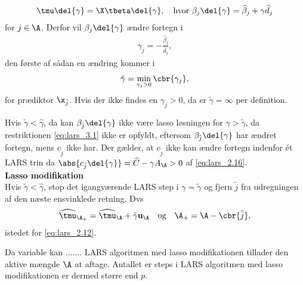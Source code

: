 \begin{align*}
\tmu \del{\gamma} = \X \tbeta \del{\gamma}, \quad \text{hvor } \beta_j \del{\gamma} = \widehat{\beta}_j + \gamma \widehat{d}_j
\end{align*}
for \(j \in \A\).
Derfor vil \(\beta_j \del{\gamma}\) ændre fortegn i
\begin{align*}
\gamma_j = -\frac{\widehat{\beta}_j}{\widehat{d}_j},
\end{align*}
den første af sådan en ændring kommer i
\begin{align*}
\tilde{\gamma} = \min_{\gamma_j > 0} \cbr{\gamma_j},
\end{align*}
for prædiktor \(\x_{\tilde{j}}\).
Hvis der ikke findes en \(\gamma_j > 0\), da er \(\tilde{\gamma}=\infty\) per definition.

Hvis \(\tilde{\gamma} < \widehat{\gamma}\), da kan \(\beta_{\tilde{j}} \del{\gamma}\) ikke være lasso løsningen for \(\gamma > \tilde{\gamma}\), da restriktionen \eqref{eq:lars_3.1} ikke er opfyldt, eftersom \(\beta_{\tilde{j}} \del{\gamma}\) har ændret fortegn, mens \(c_{\tilde{j}}\) ikke har.
Der gælder, at \(c_{\tilde{j}}\) ikke kan ændre fortegn indenfor ét LARS trin da \(\abs{c_{\tilde{j}} \del{\gamma}} = \widehat{C} - \gamma A_\A> 0\) af \eqref{eq:lars_2.16}. \\[2mm]
%
\textbf{Lasso modifikation} \\
Hvis \(\tilde{\gamma} < \widehat{\gamma}\), stop det igangværende LARS step i \(\gamma = \tilde{\gamma}\) og fjern \(\tilde{j}\) fra udregningen af den næste ensvinklede retning.
Dvs
\begin{align*}
\widehat{\tmu}_{\A_+} = \widehat{\tmu}_\A + \tilde{\gamma} \mathbf{u}_\A \quad \text{og} \quad \A_+ = \A - \cbr{\tilde{j}},
\end{align*}
istedet for \eqref{eq:lars_2.12}.

Da variable kan .......
LARS algoritmen med lasso modifikationen tillader den aktive mængde \(\A\) at aftage.
Antallet er steps i LARS algoritmen med lasso modifikationen er dermed større end \(p\).



